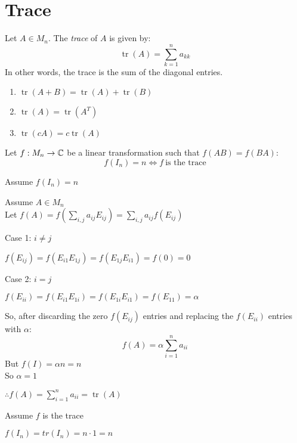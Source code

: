 \documentclass[letterpaper,12pt,fleqn]{article}
\DeclareMathOperator{\tr}{tr}
\renewcommand{\a}{\alpha}
\begin{document}
\section*{Trace}

\begin{definition}[Trace]
  Let $A\in M_n$. The \emph{trace} of $A$ is given by:
  \[\tr(A)=\sum_{k=1}^na_{kk}\]
  In other words, the trace is the sum of the diagonal entries.
\end{definition}

\begin{properties}[Trace]
  \listbreak
  \begin{enumerate}
  \item $\tr(A+B)=\tr(A)+\tr(B)$
  \item $\tr(A)=\tr(A^T)$
  \item $\tr(cA)=c\tr(A)$
  \end{enumerate}
\end{properties}

\begin{theorem}
  Let $f:M_n\to\mathbb{C}$ be a linear transformation such that $f(AB)=f(BA)$:
  \[f(I_n)=n\iff f\ \mbox{is the trace}\]
\end{theorem}

\begin{theproof}
  \listbreak
  \begin{description}
  \item Assume $f(I_n)=n$

    Assume $A\in M_n$ \\
    Let $f(A)=f\left(\sum_{i,j}a_{ij}E_{ij}\right)=\sum_{i,j}a_{ij}f(E_{ij})$
    \begin{description}
    \item Case 1: $i\ne j$

      $f(E_{ij})=f(E_{i1}E_{1j})=f(E_{1j}E_{i1})=f(0)=0$

    \item Case 2: $i=j$

      $f(E_{ii})=f(E_{i1}E_{1i})=f(E_{1i}E_{i1})=f(E_{11})=\a$
    \end{description}

    So, after discarding the zero $f(E_{ij})$ entries and replacing the $f(E_{ii})$
    entries with $\a$:
    \[f(A)=\a\sum_{i=1}^na_{ii}\]
    But $f(I)=\a n=n$ \\
    So $\a=1$

    $\therefore f(A)=\sum_{i=1}^na_{ii}=\tr(A)$

  \item Assume $f$ is the trace

    $f(I_n)=tr(I_n)=n\cdot1=n$
  \end{description}
\end{theproof}
\end{document}
